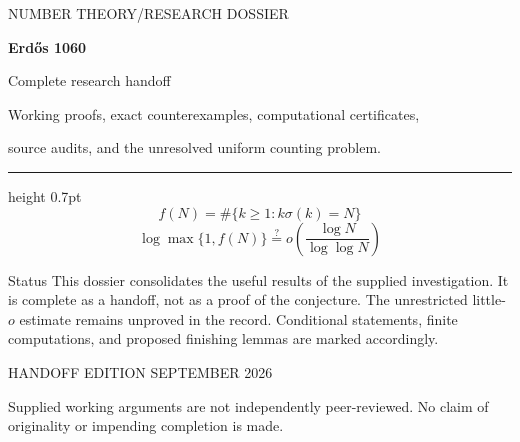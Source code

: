 \documentclass[11pt,a4paper,oneside]{report}
\theoremstyle{definition}\newtheorem{definition}[theorem]{Definition}
\theoremstyle{remark}\newtheorem*{remark}{Remark}
\numberwithin{equation}{chapter}
\begin{document}
\hypersetup{pageanchor=false}
\begin{titlepage}
\thispagestyle{empty}
{\sffamily\small\color{teal}NUMBER THEORY\quad /\quad RESEARCH DOSSIER}\par
\vspace{22mm}
{\fontsize{38}{44}\selectfont\bfseries\color{navy}Erd\H{o}s 1060}\par
\vspace{5mm}
{\fontsize{22}{28}\selectfont\color{navy}Complete research handoff}\par
\vspace{8mm}
{\large Working proofs, exact counterexamples, computational certificates,\par source audits, and the unresolved uniform counting problem.}\par
\vspace{16mm}
\hrule height 0.7pt
\vspace{10mm}
\[
 f(N)=\#\{k\ge1:k\sigma(k)=N\}
\]
\[
 \boxed{\log\max\{1,f(N)\}\stackrel{?}{=}o\!\left(\frac{\log N}{\log\log N}\right)}
\]
\vspace{10mm}
\begin{statusbox}{Status}
This dossier consolidates the useful results of the supplied investigation.
It is complete as a handoff, not as a proof of the conjecture. The unrestricted
little-$o$ estimate remains unproved in the record. Conditional statements,
finite computations, and proposed finishing lemmas are marked accordingly.
\end{statusbox}
\vfill
{\sffamily\color{muted}HANDOFF EDITION SEPTEMBER 2026}\par
\vspace{3mm}
{\small Supplied working arguments are not independently peer-reviewed.
No claim of originality or impending completion is made.}
\end{titlepage}
\hypersetup{pageanchor=true}
\tableofcontents
\clearpage
{}





















\appendix

\clearpage

\end{document}
